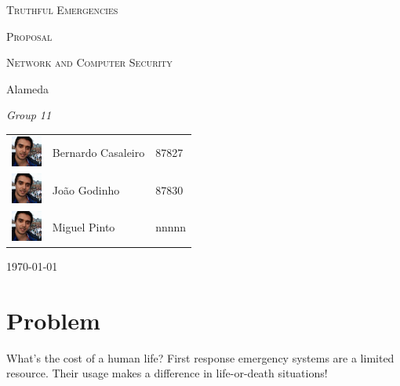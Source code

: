 \documentclass[a4paper,titlepage,11pt]{article}
\begin{document}
\begin{titlepage}
  \begin{center}
    {\scshape \huge Truthful Emergencies \par}
    \vspace{1cm}

    {\scshape \LARGE Proposal \par}
    \vspace{1.5cm}

    {\scshape \Large Network and Computer Security \par}
    \vspace{0.5cm}

    {\Large Alameda \par}
    \vfill

    {\itshape \Large Group 11 \par}
    \vfill

    \begin{tabular}{l l l}
      \includegraphics[width=10mm, height=10mm]{img/bernardo.jpeg} & Bernardo Casaleiro & 87827\\
      \includegraphics[width=10mm, height=10mm]{img/bernardo.jpeg} & João Godinho & 87830\\                       %
      \includegraphics[width=10mm, height=10mm]{img/bernardo.jpeg} & Miguel Pinto & nnnnn\\                       %
    \end{tabular}
    \vfill

    {\large \today\par}
  \end{center}
\end{titlepage}

\section{Problem}
What's the cost of a human life?
First response emergency systems are a limited resource. Their usage makes a difference in life-or-death situations!
\end{document}
